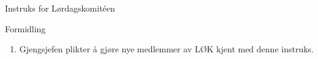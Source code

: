 \begin{instruks*}{Instruks for Lørdagskomit\'een}
    \begin{instruksledd}{Formidling}
        \begin{enumerate}
            \item Gjengsjefen plikter å gjøre nye medlemmer av LØK kjent med denne instruks.
        \end{enumerate}
    \end{instruksledd}

\end{instruks*}


